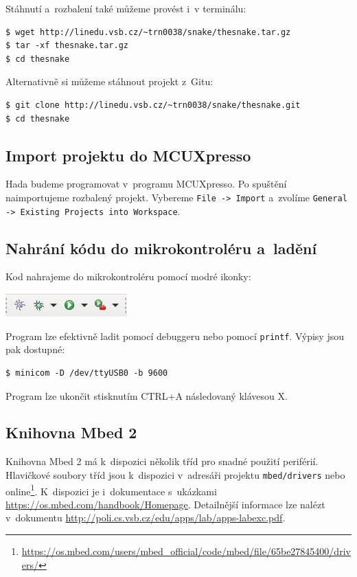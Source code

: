 \documentclass[12pt]{article}
\begin{document}
Stáhnutí a~rozbalení také můžeme provést i~v terminálu:
\begin{verbatim}
$ wget http://linedu.vsb.cz/~trn0038/snake/thesnake.tar.gz
$ tar -xf thesnake.tar.gz
$ cd thesnake 
\end{verbatim}

Alternativně si můžeme stáhnout projekt z~Gitu:
\begin{verbatim}
$ git clone http://linedu.vsb.cz/~trn0038/snake/thesnake.git
$ cd thesnake
\end{verbatim}

\subsection{Import projektu do MCUXpresso}
Hada budeme programovat v~programu MCUXpresso.
Po spuštění naimportujeme rozbalený projekt.
Vybereme \texttt{File -> Import} a~zvolíme \texttt{General -> Existing Projects into Workspace}.

\subsection{Nahrání kódu do mikrokontroléru a~ladění}
Kod nahrajeme do mikrokontroléru pomocí modré ikonky:

\begin{center}
\includegraphics{figures/blue-debug.jpg}
\end{center}

Program lze efektivně ladit pomocí debuggeru nebo pomocí \texttt{printf}.
Výpisy jsou pak dostupné:
\begin{verbatim}
$ minicom -D /dev/ttyUSB0 -b 9600
\end{verbatim}
Program lze ukončit stisknutím \textsc{CTRL+A} následovaný klávesou \textsc{X}.

\subsection{Knihovna Mbed 2}
Knihovna Mbed 2 má k~dispozici několik tříd pro snadné použití periférií.
Hlavičkové soubory tříd jsou k~dispozici v~adresáři projektu \texttt{mbed/drivers} nebo online\footnote{\url{https://os.mbed.com/users/mbed_official/code/mbed/file/65be27845400/drivers/}}.
K~dispozici je i~dokumentace s~ukázkami \url{https://os.mbed.com/handbook/Homepage}.
Detailnější informace lze nalézt v~dokumentu \url{http://poli.cs.vsb.cz/edu/apps/lab/apps-labexc.pdf}.
\end{document}
